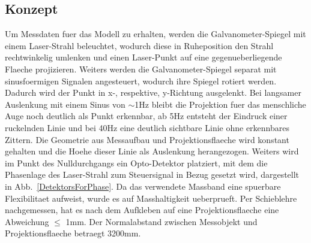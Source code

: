 \subsection{Konzept}
Um Messdaten fuer das Modell zu erhalten, werden die Galvanometer-Spiegel mit einem Laser-Strahl beleuchtet, wodurch diese in Ruheposition den Strahl rechtwinkelig umlenken und einen Laser-Punkt auf eine gegenueberliegende Flaeche projizieren. Weiters werden die Galvanometer-Spiegel separat mit sinusfoermigen Signalen angesteuert, wodurch ihre Spiegel rotiert werden. Dadurch wird der Punkt in x-, respektive, y-Richtung ausgelenkt. Bei langsamer Auslenkung mit einem Sinus von $\sim$1Hz bleibt die Projektion fuer das menschliche Auge noch deutlich als Punkt erkennbar, ab 5Hz entsteht der Eindruck einer ruckelnden Linie und bei 40Hz eine deutlich sichtbare Linie ohne erkennbares Zittern. Die Geometrie aus Messaufbau und Projektionsflaeche wird konstant gehalten und die Hoehe dieser Linie als Auslenkung herangezogen. Weiters wird im Punkt des Nulldurchgangs ein Opto-Detektor platziert, mit dem die Phasenlage des Laser-Strahl zum Steuersignal in Bezug gesetzt wird, dargestellt in Abb.~\ref{DetektorsForPhase}. Da das verwendete Massband eine spuerbare Flexibilitaet aufweist, wurde es auf Masshaltigkeit ueberprueft. Per Schieblehre nachgemessen, hat es nach dem Aufkleben auf eine Projektionsflaeche eine Abweichung $\le$ 1mm. Der Normalabstand zwischen Messobjekt und Projektionsflaeche betraegt 3200mm.
